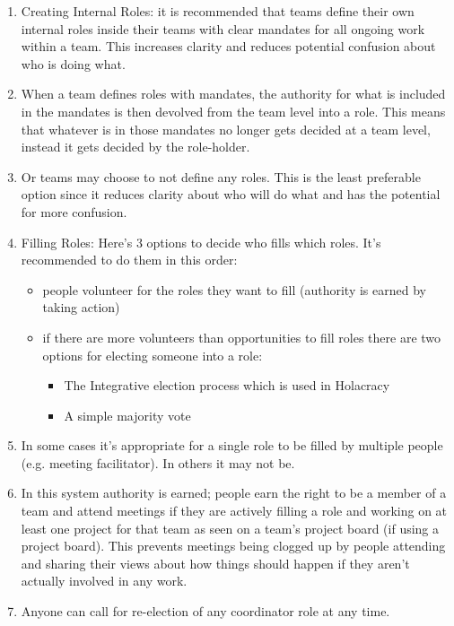 \documentclass[12pt,a4paper,oneside]{article}
\begin{document}
\begin{enumerate}
\item
  Creating Internal Roles: it is recommended that teams define their own
  internal roles inside their teams with clear mandates for all ongoing work
  within a team. This increases clarity and reduces potential confusion about
  who is doing what.

\item
  When a team defines roles with mandates, the authority for what is included in
  the mandates is then devolved from the team level into a role. This means that
  whatever is in those mandates no longer gets decided at a team level, instead
  it gets decided by the role-holder.

\item
  Or teams may choose to not define any roles. This is the least preferable
  option since it reduces clarity about who will do what and has the potential
  for more confusion.

\item
  Filling Roles: Here’s 3 options to decide who fills which roles. It’s
  recommended to do them in this order:
  \begin{itemize}
  \item
    people volunteer for the roles they want to fill (authority is earned by
    taking action)

  \item
    if there are more volunteers than opportunities to fill roles there are two
    options for electing someone into a role:
    \begin{itemize}
    \item
      The Integrative election process which is used in Holacracy
    \item
      A simple majority vote
    \end{itemize}
  \end{itemize}

\item
  In some cases it’s appropriate for a single role to be filled by multiple
  people (e.g. meeting facilitator). In others it may not be.

\item
  In this system authority is earned; people earn the right to be a member of a
  team and attend meetings if they are actively filling a role and working on at
  least one project for that team as seen on a team’s project board (if using a
  project board). This prevents meetings being clogged up by people attending
  and sharing their views about how things should happen if they aren’t actually
  involved in any work.

\item
  Anyone can call for re-election of any coordinator role at any time.
\end{enumerate}
\end{document}

